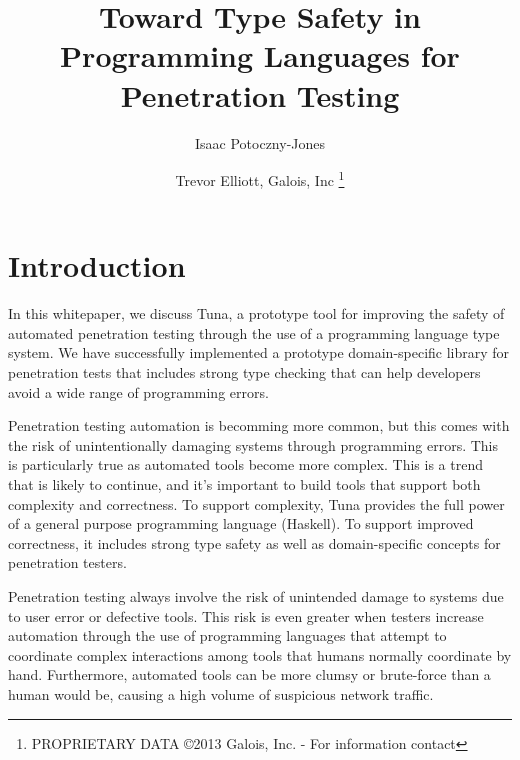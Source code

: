 \documentclass[figure,letterpaper,onefignum]{mysiam}
\title{Toward Type Safety in Programming Languages for Penetration Testing}
\author{Isaac Potoczny-Jones \and
  Trevor Elliott, Galois, Inc \thanks{PROPRIETARY DATA \copyright 2013 Galois, Inc. - For information contact \email{ijones@galois.com}}
}
\begin{document}
\maketitle




\pagestyle{myheadings}
\thispagestyle{plain}


\section{Introduction}
In this whitepaper, we discuss Tuna, a prototype tool for improving the safety of automated penetration testing through the use of a programming language type system. We have successfully implemented a prototype domain-specific library for penetration tests that includes strong type checking that can help developers avoid a wide range of programming errors.

Penetration testing automation is becomming more common, but this comes with the risk of unintentionally damaging systems through programming errors. This is particularly true as automated tools become more complex. This is a trend that is likely to continue, and it's important to build tools that support both complexity and correctness.  To support complexity, Tuna provides the full power of a general purpose programming language (Haskell). To support improved correctness, it includes strong type safety as well as domain-specific concepts for penetration testers.

Penetration testing always involve the risk of unintended damage to systems due to user error or defective tools. This risk is even greater when testers increase automation through the use of programming languages that attempt to coordinate complex interactions among tools that humans normally coordinate by hand. Furthermore, automated tools can be more clumsy or brute-force than a human would be, causing a high volume of suspicious network traffic.
\end{document}
